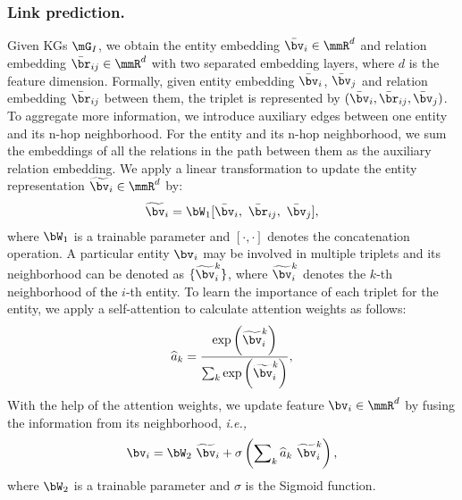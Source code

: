 \documentclass[letterpaper]{article}
\def\hmg{\textcolor{black}}
\def\ie{\emph{i.e., }}
\begin{document}
\subsubsection{Link prediction.}
Given KGs $\mG_{I}$, we obtain the entity embedding $\bar{\bv}_i \in \mmR^{d}$ and relation embedding $\bar{\br}_{ij} \in \mmR^{d}$ with two separated embedding layers, where $d$ is the feature dimension.
Formally, given entity embedding $\bar{\bv}_i$, $\bar{\bv}_j$ and relation embedding $\bar{\br}_{ij}$ between them, the triplet is represented by $(\bar{\bv}_i, \bar{\br}_{ij}, \bar{\bv}_j)$.
To aggregate more information, we introduce auxiliary edges between one entity and its n-hop neighborhood. For the entity and its n-hop neighborhood, we sum the embeddings of all the relations in the path between them as the auxiliary relation embedding.
We apply a linear transformation to update the entity representation $\widetilde{\bv}_i \in \mmR^{d}$ by:
\begin{equation}
    \begin{aligned}
    \label{eq:update_entity}
    \widetilde{\bv}_i = \bW_{1} [\bar{\bv}_i, \ \bar{\br}_{ij}, \ \bar{\bv}_j],
    \end{aligned}
\end{equation}
where $\bW_1$ is a trainable parameter and $[\cdot,\cdot]$ denotes the concatenation operation. 
A particular entity $\bv_i$ may be involved in multiple triplets and its neighborhood can be denoted as $\{ \widetilde{\bv}_i^{k} \}$, where $\widetilde{\bv}_i^{k}$ denotes the $k$-th neighborhood of \hmg{the} $i$-th entity. 
To learn the importance of each triplet for the entity, we apply a self-attention to calculate attention weights 
as follows:
\begin{equation}
    \begin{aligned}
    \widehat{a}_k =  \frac{\exp \left( \widetilde{\bv}_i^{k} \right)}{\sum_{k}  \exp \left( \widetilde{\bv}_i^{k} \right) },
\end{aligned}
\end{equation}
With the help of the attention weights, we update feature $\bv_i \in \mmR^{d}$ by fusing the information from its neighborhood, \ie
\begin{equation}
    \begin{aligned}
    \bv_i = \bW_{2} \ \widetilde{\bv}_i + \sigma \left(\sum\nolimits_{k} \widehat{a}_k \ \widetilde{\bv}_i^{k}\right),
\end{aligned}
\end{equation}
where $\bW_2$ is a trainable parameter and $\sigma$ is the Sigmoid function.
\end{document}
